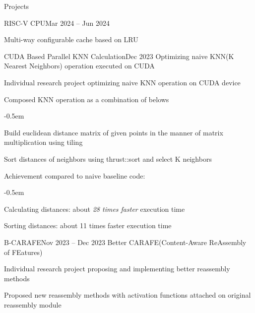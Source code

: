 \documentclass{resume}
\begin{document}
\begin{rSection}{Projects}
\begin{rSubsection}{RISC-V CPU}{Mar 2024 -- Jun 2024}
\begin{list}{--}{\setlength{\rightmargin}{1.5em}}
            \item Multi-way configurable cache based on LRU
        \end{list}
    \end{rSubsection}

    \begin{rSubsection}{CUDA Based Parallel KNN Calculation}{Dec 2023}
        Optimizing naive KNN(K Nearest Neighbors) operation executed on CUDA

        \item Individual research project optimizing naive KNN operation on CUDA device

        \item Composed KNN operation as a combination of belows
        \vspace{-0.5em}
        \begin{list}{--}{\setlength{\rightmargin}{1.5em}}
            \itemsep -0.5em

            \item Build euclidean distance matrix of given points in the manner of matrix multiplication using tiling

            \item Sort distances of neighbors using thrust::sort and select K neighbors
        \end{list}

        \item Achievement compared to naive baseline code:
        \vspace{-0.5em}
        \begin{list}{--}{\setlength{\rightmargin}{1.5em}}
            \itemsep -0.5em

            \item Calculating distances: about \emph{28 times faster} execution time

            \item Sorting distances: about 11 times faster execution time
        \end{list}
    \end{rSubsection}

    \begin{rSubsection}{B-CARAFE}{Nov 2023 -- Dec 2023}
        Better CARAFE(Content-Aware ReAssembly of FEatures)

        \item Individual research project proposing and implementing better reassembly methods

        \item Proposed new reassembly methods with activation functions attached on original reassembly module


\end{rSubsection}
\end{rSection}
\end{document}
